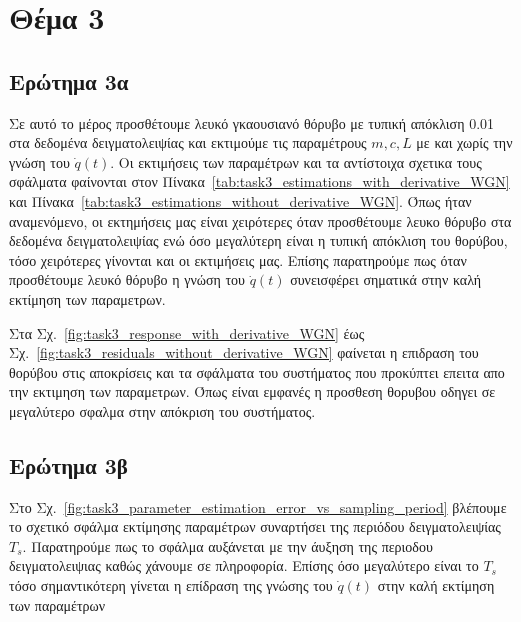 \documentclass[a4paper,12pt]{article}
\begin{document}

\section*{Θέμα 3}

\subsection*{Ερώτημα 3α}

Σε αυτό το μέρος προσθέτουμε λευκό γκαουσιανό θόρυβο με τυπική απόκλιση 0.01 στα δεδομένα δειγματολειψίας και
εκτιμούμε τις παραμέτρους $m, c, L$ με και χωρίς την γνώση του $\dot{q}(t)$. Οι εκτιμήσεις των παραμέτρων και τα 
αντίστοιχα σχετικα τους σφάλματα φαίνονται στον Πίνακα~\ref{tab:task3_estimations_with_derivative_WGN} και 
Πίνακα~\ref{tab:task3_estimations_without_derivative_WGN}. Όπως ήταν αναμενόμενο,
οι εκτημήσεις μας είναι χειρότερες όταν προσθέτουμε λευκο θόρυβο στα δεδομένα δειγματολειψίας ενώ όσο μεγαλύτερη 
είναι η τυπική απόκλιση του θορύβου, τόσο χειρότερες γίνονται και οι εκτιμήσεις μας. Επίσης παρατηρούμε πως όταν
προσθέτουμε λευκό θόρυβο η γνώση του $\dot{q}(t)$ συνεισφέρει σηματικά στην καλή εκτίμηση των παραμετρων.

Στα Σχ.~\ref{fig:task3_response_with_derivative_WGN} έως Σχ.~\ref{fig:task3_residuals_without_derivative_WGN} φαίνεται
η επιδραση του θορύβου στις αποκρίσεις και τα σφάλματα του συστήματος που προκύπτει επειτα απο την εκτιμηση των παραμετρων.
Όπως είναι εμφανές η προσθεση θορυβου οδηγει σε μεγαλύτερο σφαλμα στην απόκριση του συστήματος.

\subsection*{Ερώτημα 3β}

Στο Σχ.~\ref{fig:task3_parameter_estimation_error_vs_sampling_period} βλέπουμε το σχετικό σφάλμα εκτίμησης παραμέτρων
συναρτήσει της περιόδου δειγματολειψίας $T_s$. Παρατηρούμε πως το σφάλμα αυξάνεται με την άυξηση της περιοδου 
δειγματολειψιας καθώς χάνουμε σε πληροφορία. Επίσης όσο μεγαλύτερο είναι το $T_s$ τόσο σημαντικότερη γίνεται η
επίδραση της γνώσης του $\dot{q}(t)$ στην καλή εκτίμηση των παραμέτρων
\end{document}
